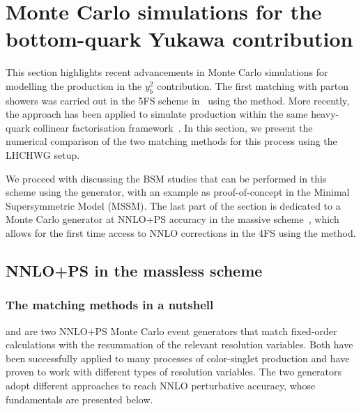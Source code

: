 \documentclass[11pt,a4paper]{article}
\begin{document}
\section{Monte Carlo simulations for the bottom-quark Yukawa contribution}\label{sec:MCyb}
This section highlights recent advancements in Monte Carlo simulations for modelling the \bbH{} production in the $y_b^2$ contribution. The first matching with parton showers was carried out in the 5FS scheme in~ using the \minnlo{} method. More recently, the \GENEVA{} approach has been applied to simulate \bbtoH{} production within the same heavy-quark collinear factorisation framework~\cite{Gavardi:2025zpf}. In this section, we present the numerical comparison of the two matching methods for this process using the LHCHWG setup.

We proceed with discussing the BSM studies that can be performed in this scheme using the \minnlo{} generator, with an example as proof-of-concept in the Minimal Supersymmetric Model (MSSM). The last part of the section is dedicated to a Monte Carlo generator at NNLO+PS accuracy in the massive scheme~\cite{Biello:2024pgo}, which allows for the first time access to NNLO corrections in the 4FS using the \minnlo{} method.

\subsection{NNLO+PS in the massless scheme}\label{sec:5FSNNLOPS}
\subsubsection{The matching methods in a nutshell}\label{sec:nutshell}

\minnlo{} and \GENEVA{} are two NNLO+PS Monte Carlo event generators
that match fixed-order calculations with the resummation of the
relevant resolution variables. Both have been successfully applied to
many processes of color-singlet production and have proven to work
with different types of resolution variables. The two generators adopt
different approaches to reach NNLO perturbative accuracy, whose
fundamentals are presented below.
\end{document}
